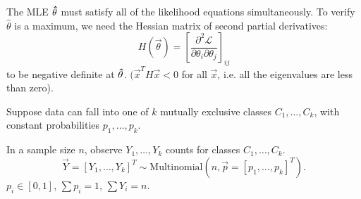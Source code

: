 \documentclass[10pt, a4paper]{article}
\begin{document}
The MLE $\mathbf{\hat{\theta}}$ must satisfy all of the likelihood equations simultaneously.
To verify $\hat{\theta}$ is a maximum,
we need the Hessian matrix of second partial derivatives:
\[
H(\vec{\theta}) = \left[\frac{\partial ^ 2\mathcal{L}}{\partial \theta_i\partial\theta_j}\right]_{ij}
\]
to be negative definite at $\mathbf{\hat{\theta}}$.
$(\vec{x} ^ TH\vec{x} < 0$ for all $\vec{x}$,
i.e. all the eigenvalues are less than zero).

\begin{example}
    Suppose data can fall into one of $k$ mutually exclusive classes $C_1, \dotsc, C_k$,
    with constant probabilities $p_1, \dotsc, p_k$.

    In a sample size $n$,
    observe $Y_1, \dotsc, Y_k$ counts for classes $C_1, \dotsc, C_k$.
    \[
    \vec{Y} = [Y_1, \dotsc, Y_k] ^ T \sim \mathrm{Multinomial}\left(n, \vec{p} = [p_1, \dotsc, p_k] ^ T\right).
    \]
    $p_i \in [0, 1]$,
    $\sum p_i = 1$,
    $\sum Y_i = n$.


\end{example}
\end{document}
